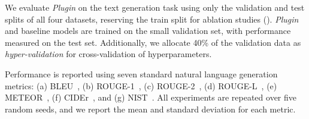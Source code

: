 We evaluate \textit{Plugin} on the text generation task using only the validation and test splits of all four datasets, reserving the train split for ablation studies (). \textit{Plugin} and baseline models are trained on the small validation set, with performance measured on the test set. Additionally, we allocate 40\% of the validation data as \textit{hyper-validation} for cross-validation of hyperparameters.

Performance is reported using seven standard natural language generation metrics: (a) BLEU~\citep{papineni2002bleu}, (b) ROUGE-1~\citep{lin2004rouge}, (c) ROUGE-2~\citep{lin2004rouge}, (d) ROUGE-L~\citep{lin2004automatic}, (e) METEOR~\citep{banerjee2005meteor}, (f) CIDEr~\citep{vedantam2015cider}, and (g) NIST~\citep{doddington2002automatic}. All experiments are repeated over five random seeds, and we report the mean and standard deviation for each metric.



 
